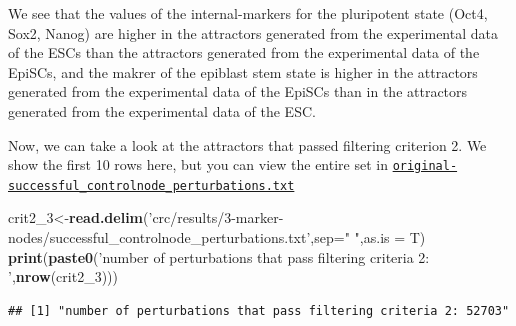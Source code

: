 \documentclass[
]{book}
\newenvironment{Shaded}{\begin{snugshade}}{\end{snugshade}}
\newcommand{\DataTypeTok}[1]{\textcolor[rgb]{0.13,0.29,0.53}{#1}}
\newcommand{\DecValTok}[1]{\textcolor[rgb]{0.00,0.00,0.81}{#1}}
\newcommand{\KeywordTok}[1]{\textcolor[rgb]{0.13,0.29,0.53}{\textbf{#1}}}
\newcommand{\NormalTok}[1]{#1}
\newcommand{\OperatorTok}[1]{\textcolor[rgb]{0.81,0.36,0.00}{\textbf{#1}}}
\newcommand{\StringTok}[1]{\textcolor[rgb]{0.31,0.60,0.02}{#1}}
\begin{document}
We see that the values of the internal-markers for the pluripotent state (Oct4, Sox2, Nanog) are higher in the attractors generated from the experimental data of the ESCs than the attractors generated from the experimental data of the EpiSCs, and the makrer of the epiblast stem state is higher in the attractors generated from the experimental data of the EpiSCs than in the attractors generated from the experimental data of the ESC.

Now, we can take a look at the attractors that passed filtering criterion 2. We show the first 10 rows here, but you can view the entire set in \href{https://github.com/VeraLiconaResearchGroup/Netisce/blob/main/ipsc_validation/results/original-successful_controlnode_perturbations.txt}{\texttt{original-successful\_controlnode\_perturbations.txt}}

\begin{Shaded}
\begin{Highlighting}[]
\NormalTok{crit2_}\DecValTok{3}\NormalTok{<-}\KeywordTok{read.delim}\NormalTok{(}\StringTok{'crc/results/3-marker-nodes/successful_controlnode_perturbations.txt'}\NormalTok{,}\DataTypeTok{sep=}\StringTok{" "}\NormalTok{,}\DataTypeTok{as.is =}\NormalTok{ T)}
\KeywordTok{print}\NormalTok{(}\KeywordTok{paste0}\NormalTok{(}\StringTok{'number of perturbations that pass filtering criteria 2: '}\NormalTok{,}\KeywordTok{nrow}\NormalTok{(crit2_}\DecValTok{3}\NormalTok{)))}
\end{Highlighting}
\end{Shaded}

\begin{verbatim}
## [1] "number of perturbations that pass filtering criteria 2: 52703"
\end{verbatim}

\begin{Shaded}
\end{Shaded}
\end{document}
